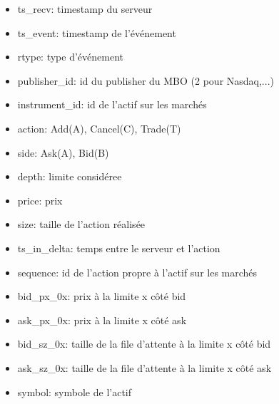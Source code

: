 \documentclass[12pt,a4paper]{article}
\theoremstyle{definition}
\theoremstyle{remark}
\begin{document}
\begin{itemize}
    \item ts\_recv: timestamp du serveur 
    \item ts\_event: timestamp de l'événement     
    \item rtype: type d'événement     
    \item publisher\_id: id du publisher du MBO (2 pour Nasdaq,...)
    \item instrument\_id: id de l'actif sur les marchés
    \item action: Add(A), Cancel(C), Trade(T)
    \item side: Ask(A), Bid(B)
    \item depth: limite considéree
    \item price: prix
    \item size: taille de l'action réalisée
    \item ts\_in\_delta: temps entre le serveur et l'action
    \item sequence: id de l'action propre à l'actif sur les marchés
    \item bid\_px\_0x: prix à la limite x côté bid
    \item ask\_px\_0x: prix à la limite x côté ask
    \item bid\_sz\_0x: taille de la file d'attente à la limite x côté bid
    \item ask\_sz\_0x: taille de la file d'attente à la limite x côté ask
    \item symbol: symbole de l'actif
\end{itemize}
\end{document}
